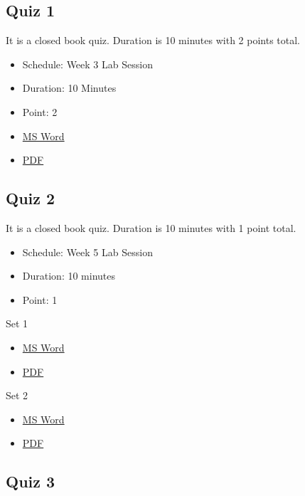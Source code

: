 \subsection{Quiz 1}\label{quiz-1}

It is a closed book quiz. Duration is 10 minutes with 2 points total.

\begin{itemize}
\tightlist
\item
  Schedule: Week 3 Lab Session
\item
  Duration: 10 Minutes
\item
  Point: 2
\item
  \href{https://drive.google.com/open?id=0B88HKpainTSfTXJBU0RuYkV5c2s}{MS
  Word}
\item
  \href{https://drive.google.com/open?id=0B88HKpainTSfTDNrNjJIZ3VvQUE}{PDF}
\end{itemize}

\subsection{Quiz 2}\label{quiz-2}

It is a closed book quiz. Duration is 10 minutes with 1 point total.

\begin{itemize}
\tightlist
\item
  Schedule: Week 5 Lab Session
\item
  Duration: 10 minutes
\item
  Point: 1
\end{itemize}

Set 1

\begin{itemize}
\tightlist
\item
  \href{https://drive.google.com/open?id=0B88HKpainTSfRUNCdnVxLXY2Tjg}{MS
  Word}
\item
  \href{https://drive.google.com/open?id=0B88HKpainTSfekJpWTJBZ0J4RFU}{PDF}
\end{itemize}

Set 2

\begin{itemize}
\tightlist
\item
  \href{https://drive.google.com/open?id=0B88HKpainTSfeWpUQUJsTUdFSVE}{MS
  Word}
\item
  \href{https://drive.google.com/open?id=0B88HKpainTSfMjRLTHdmSjJVelE}{PDF}
\end{itemize}

\subsection{Quiz 3}\label{quiz-3}

